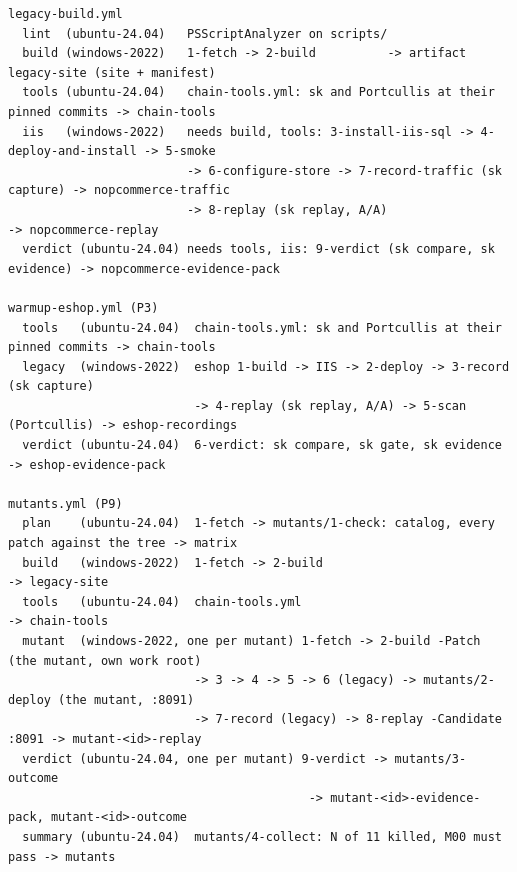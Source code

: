 \begin{lstlisting}
legacy-build.yml
  lint  (ubuntu-24.04)   PSScriptAnalyzer on scripts/
  build (windows-2022)   1-fetch -> 2-build          -> artifact legacy-site (site + manifest)
  tools (ubuntu-24.04)   chain-tools.yml: sk and Portcullis at their pinned commits -> chain-tools
  iis   (windows-2022)   needs build, tools: 3-install-iis-sql -> 4-deploy-and-install -> 5-smoke
                         -> 6-configure-store -> 7-record-traffic (sk capture) -> nopcommerce-traffic
                         -> 8-replay (sk replay, A/A)                        -> nopcommerce-replay
  verdict (ubuntu-24.04) needs tools, iis: 9-verdict (sk compare, sk evidence) -> nopcommerce-evidence-pack

warmup-eshop.yml (P3)
  tools   (ubuntu-24.04)  chain-tools.yml: sk and Portcullis at their pinned commits -> chain-tools
  legacy  (windows-2022)  eshop 1-build -> IIS -> 2-deploy -> 3-record (sk capture)
                          -> 4-replay (sk replay, A/A) -> 5-scan (Portcullis) -> eshop-recordings
  verdict (ubuntu-24.04)  6-verdict: sk compare, sk gate, sk evidence       -> eshop-evidence-pack

mutants.yml (P9)
  plan    (ubuntu-24.04)  1-fetch -> mutants/1-check: catalog, every patch against the tree -> matrix
  build   (windows-2022)  1-fetch -> 2-build                               -> legacy-site
  tools   (ubuntu-24.04)  chain-tools.yml                                  -> chain-tools
  mutant  (windows-2022, one per mutant) 1-fetch -> 2-build -Patch (the mutant, own work root)
                          -> 3 -> 4 -> 5 -> 6 (legacy) -> mutants/2-deploy (the mutant, :8091)
                          -> 7-record (legacy) -> 8-replay -Candidate :8091 -> mutant-<id>-replay
  verdict (ubuntu-24.04, one per mutant) 9-verdict -> mutants/3-outcome
                                          -> mutant-<id>-evidence-pack, mutant-<id>-outcome
  summary (ubuntu-24.04)  mutants/4-collect: N of 11 killed, M00 must pass -> mutants
\end{lstlisting}

